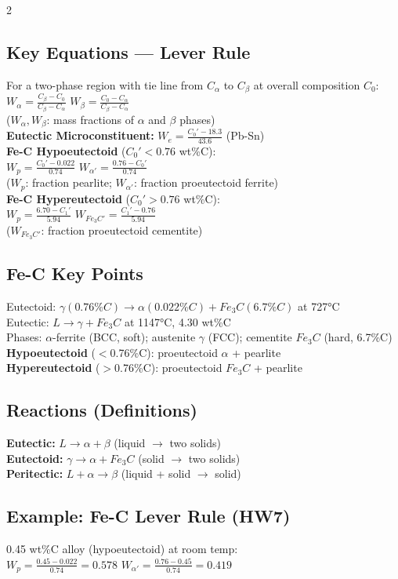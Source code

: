 \documentclass[8pt]{extarticle}
\begin{document}
\begin{multicols*}{2}
\subsection*{Key Equations — Lever Rule}
For a two-phase region with tie line from $C_\alpha$ to $C_\beta$ at overall composition $C_0$: \\
$W_\alpha = \frac{C_\beta - C_0}{C_\beta - C_\alpha}$ \quad $W_\beta = \frac{C_0 - C_\alpha}{C_\beta - C_\alpha}$ \\
($W_\alpha, W_\beta$: mass fractions of $\alpha$ and $\beta$ phases) \\
\textbf{Eutectic Microconstituent:} $W_e = \frac{C_0' - 18.3}{43.6}$ (Pb-Sn) \\
\textbf{Fe-C Hypoeutectoid} ($C_0' < 0.76$ wt\%C): \\
$W_p = \frac{C_0' - 0.022}{0.74}$ \quad $W_{\alpha'} = \frac{0.76 - C_0'}{0.74}$ \\
($W_p$: fraction pearlite; $W_{\alpha'}$: fraction proeutectoid ferrite) \\
\textbf{Fe-C Hypereutectoid} ($C_0' > 0.76$ wt\%C): \\
$W_p = \frac{6.70 - C_1'}{5.94}$ \quad $W_{Fe_3C'} = \frac{C_1' - 0.76}{5.94}$ \\
($W_{Fe_3C'}$: fraction proeutectoid cementite)
\subsection*{Fe-C Key Points}
Eutectoid: $\gamma(0.76\%C) \rightarrow \alpha(0.022\%C) + Fe_3C(6.7\%C)$ at 727°C \\
Eutectic: $L \rightarrow \gamma + Fe_3C$ at 1147°C, 4.30 wt\%C \\
Phases: $\alpha$-ferrite (BCC, soft); austenite $\gamma$ (FCC); cementite $Fe_3C$ (hard, 6.7\%C) \\
\textbf{Hypoeutectoid} ($<$0.76\%C): proeutectoid $\alpha$ + pearlite \\
\textbf{Hypereutectoid} ($>$0.76\%C): proeutectoid $Fe_3C$ + pearlite
\subsection*{Reactions (Definitions)}
\textbf{Eutectic:} $L \rightarrow \alpha + \beta$ (liquid $\to$ two solids) \\
\textbf{Eutectoid:} $\gamma \rightarrow \alpha + Fe_3C$ (solid $\to$ two solids) \\
\textbf{Peritectic:} $L + \alpha \rightarrow \beta$ (liquid + solid $\to$ solid)
\subsection*{Example: Fe-C Lever Rule (HW7)}
0.45 wt\%C alloy (hypoeutectoid) at room temp: \\
$W_p = \frac{0.45 - 0.022}{0.74} = 0.578$ \quad $W_{\alpha'} = \frac{0.76-0.45}{0.74} = 0.419$


\end{multicols*}
\end{document}
